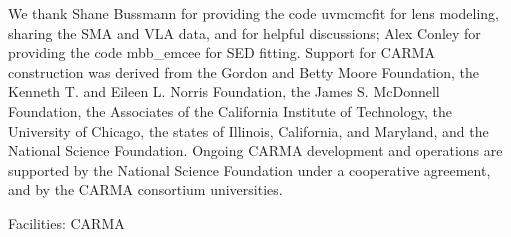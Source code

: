 \documentclass[iop]{emulateapj}
\begin{document}
\begin{acknowledgments}
We thank Shane Bussmann for providing the code {\sc uvmcmcfit} for lens modeling, sharing the SMA and VLA data, and for helpful discussions; Alex Conley for providing the code {\sc mbb\_emcee} for SED fitting. 
Support for CARMA construction was derived from the
Gordon and Betty Moore Foundation, the Kenneth T. and Eileen
L. Norris Foundation, the James S. McDonnell Foundation, the
Associates of the California Institute of Technology, the University
of Chicago, the states of Illinois, California, and Maryland,
and the National Science Foundation. 
Ongoing CARMA development
and operations are supported by the National Science
Foundation under a cooperative agreement, and by the CARMA
consortium universities.

Facilities: CARMA
\end{acknowledgments}




\end{document}
